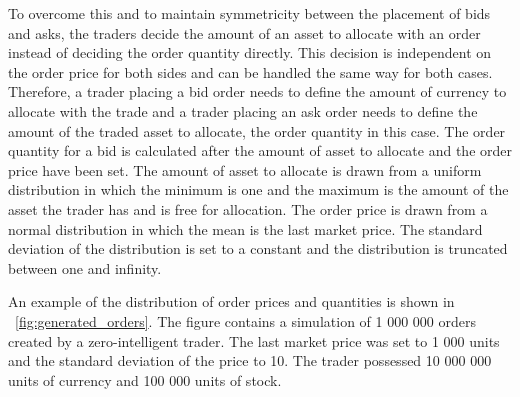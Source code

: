 To overcome this and to maintain symmetricity between the placement of bids and asks, 
the traders decide the amount of an asset to allocate with an order instead of deciding 
the order quantity directly. This decision is independent on the order price for both
sides and can be handled the same way for both cases. Therefore, a trader placing a bid order 
needs to define the amount of currency to allocate with the trade and a trader placing an ask
order needs to define the amount of the traded asset to allocate, the order quantity in this case. 
The order quantity for a bid is calculated after the amount of asset to allocate 
and the order price have been set. The amount of asset to allocate is drawn from a uniform
distribution in which the minimum is one and the maximum is the amount of the asset the trader
has and is free for allocation. The order price is drawn from a normal distribution in which 
the mean is the last market price. The standard deviation of the distribution is set to a 
constant and the distribution is truncated between one and infinity.


An example of the distribution of order prices and quantities
is shown in ~\ref{fig:generated_orders}. The figure contains a simulation 
of 1 000 000 orders created by a zero-intelligent trader. 
The last market price was set to 1 000 units and the standard deviation of the price to 10. 
The trader possessed 10 000 000 units of currency and 100 000 
units of stock.

